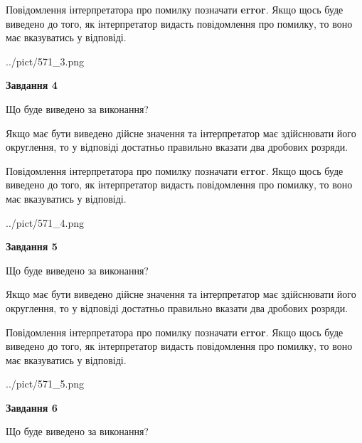 \documentclass[12pt, ukrainian]{article}
\begin{document}
{\begin {Large}
Повідомлення інтерпретатора про помилку позначати \textbf{error}.
Якщо щось буде виведено до того, як інтерпретатор видасть повідомлення про помилку, 
то воно має вказуватись у відповіді. \par

\begin{center}
	{../pict/571_3.png}
\end{center}
\newpage

{\begin {center}\textbf{Завдання 4}\end {center}}\par
Що буде виведено за виконання? \par

Якщо має бути виведено дійсне значення та інтерпретатор має здійснювати його округлення, 
то у відповіді достатньо правильно вказати два дробових розряди.

Повідомлення інтерпретатора про помилку позначати \textbf{error}.
Якщо щось буде виведено до того, як інтерпретатор видасть повідомлення про помилку, 
то воно має вказуватись у відповіді. \par

\begin{center}
	{../pict/571_4.png}
\end{center}
\newpage

{\begin {center}\textbf{Завдання 5}\end {center}}\par
Що буде виведено за виконання? \par

Якщо має бути виведено дійсне значення та інтерпретатор має здійснювати його округлення, 
то у відповіді достатньо правильно вказати два дробових розряди.

Повідомлення інтерпретатора про помилку позначати \textbf{error}.
Якщо щось буде виведено до того, як інтерпретатор видасть повідомлення про помилку, 
то воно має вказуватись у відповіді. \par

\begin{center}
	{../pict/571_5.png}
\end{center}
\newpage

{\begin {center}\textbf{Завдання 6}\end {center}}\par
Що буде виведено за виконання? \par


\end{Large}}
\end{document}
